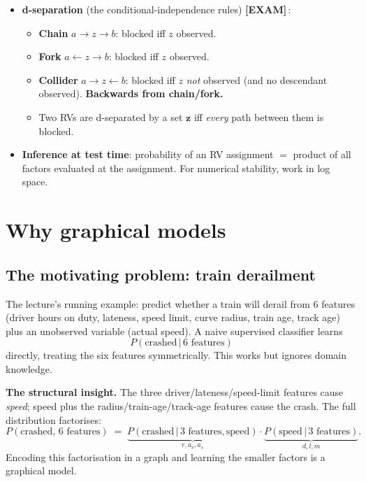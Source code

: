 \documentclass[11pt, a4paper]{article}
\newcommand{\examflag}{\textcolor{tipBd}{\textbf{[EXAM]}}\,}
\begin{document}
\begin{tldrbox}
\begin{itemize}[leftmargin=*]
  \item \textbf{d-separation} (the conditional-independence rules) \examflag{}:
  \begin{itemize}
    \item \textbf{Chain} $a \to z \to b$: blocked iff $z$ observed.
    \item \textbf{Fork} $a \leftarrow z \to b$: blocked iff $z$ observed.
    \item \textbf{Collider} $a \to z \leftarrow b$: blocked iff $z$ \emph{not} observed (and no descendant observed). \textbf{Backwards from chain/fork.}
    \item Two RVs are d-separated by a set $\mathbf{z}$ iff \emph{every} path between them is blocked.
  \end{itemize}
  \item \textbf{Inference at test time}: probability of an RV assignment $=$ product of all factors evaluated at the assignment. For numerical stability, work in log space.
\end{itemize}
\end{tldrbox}

\section{Why graphical models}

\subsection{The motivating problem: train derailment}

The lecture's running example: predict whether a train will derail from 6 features (driver hours on duty, lateness, speed limit, curve radius, train age, track age) plus an unobserved variable (actual speed). A naive supervised classifier learns
\[
P(\text{crashed} \,|\, \text{6 features})
\]
directly, treating the six features symmetrically. This works but ignores domain knowledge.

\textbf{The structural insight.} The three driver/lateness/speed-limit features cause \emph{speed}; speed plus the radius/train-age/track-age features cause the crash. The full distribution factorises:
\[
P(\text{crashed},\,\text{6 features}) \;=\; \underbrace{P(\text{crashed}\,|\,\text{3 features},\text{speed})}_{r, a_v, a_s} \cdot \underbrace{P(\text{speed}\,|\,\text{3 features})}_{d,l,m}.
\]
Encoding this factorisation in a graph and learning the smaller factors is a graphical model.
\end{document}
